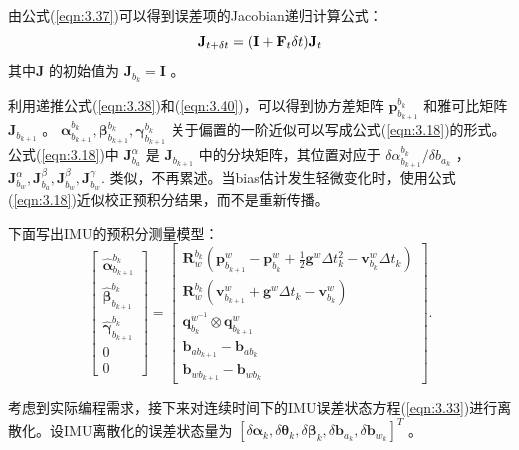由公式(\ref{eqn:3.37})可以得到误差项的Jacobian递归计算公式： 
\begin{equation}
\label{eqn:3.40}
\setlength{\abovedisplayskip}{6pt}
\setlength{\belowdisplayskip}{6pt}
\mathbf{J}_{t+\delta t}=(\mathbf{I}+\mathbf{F}_t\delta t)\mathbf{J}_t
\end{equation}
其中$\mathbf{J} $ 的初始值为 $\mathbf{J}_{b_k}=\mathbf{I}  $ 。

利用递推公式(\ref{eqn:3.38})和(\ref{eqn:3.40})，可以得到协方差矩阵 $\mathbf{p}_{b_{k+1}}^{b_k}  $ 和雅可比矩阵 $\mathbf{J}_{b_{k+1}} $ 。 $\bm{\alpha}_{b_{k+1}}^{b_k},\bm{\beta}_{b_{k+1}}^{b_k}, \bm{\gamma}_{b_{k+1}}^{b_k} $ 关于偏置的一阶近似可以写成公式(\ref{eqn:3.18})的形式。公式(\ref{eqn:3.18})中 $ \mathbf{J}_{b_a}^\alpha $ 是 $ \mathbf{J}_{b_{k+1}} $ 中的分块矩阵，其位置对应于 $ {\delta\alpha_{b_{k+1}}^{b_k}}/{\delta b_{a_k}} $ ， $ \mathbf{J}_{b_w}^\alpha,\mathbf{J}_{b_a}^\beta,\mathbf{J}_{b_w}^\beta,\mathbf{J}_{b_w}^\gamma. $ 类似，不再累述。当bias估计发生轻微变化时，使用公式(\ref{eqn:3.18})近似校正预积分结果，而不是重新传播。

下面写出IMU的预积分测量模型：
\begin{equation}
\label{eqn:3.41}
\begin{bmatrix}
\hat{\bm{\alpha}}_{b_{k+1}}^{b_k} \\ \hat{\bm{\beta}}_{b_{k+1}}^{b_k} \\ \hat{\bm{\gamma}}_{b_{k+1}}^{b_k} \\ 0 \\ 0
\end{bmatrix}=
\begin{bmatrix}
\mathbf{R}_w^{b_k}(\mathbf{p}_{b_{k+1}}^w-\mathbf{p}_{b_k}^w+\frac{1}{2}\mathbf{g}^w\Delta t_k^2-\mathbf{v}_{b_k}^w\Delta t_k) \\ \mathbf{R}_w^{b_k}(\mathbf{v}_{b_{k+1}}^w+\mathbf{g}^w\Delta t_k-\mathbf{v}_{b_k}^w) \\ \mathbf{q}_{b_k}^{w^{-1}}\otimes \mathbf{q}_{b_{k+1}}^w \\ \mathbf{b}_{ab_{k+1}}-\mathbf{b}_{ab_k} \\ \mathbf{b}_{wb_{k+1}}-\mathbf{b}_{wb_k}
\end{bmatrix}.
\end{equation}

考虑到实际编程需求，接下来对连续时间下的IMU误差状态方程(\ref{eqn:3.33})进行离散化。设IMU离散化的误差状态量为 $[\delta \bm{\alpha}_{k}, {\delta \bm{\theta}_{k}}, {\delta \bm{\beta}_{k}}, \delta \mathbf{b}_{a_{k}}, \delta \mathbf{b}_{w_{k}}]^T $ 。

